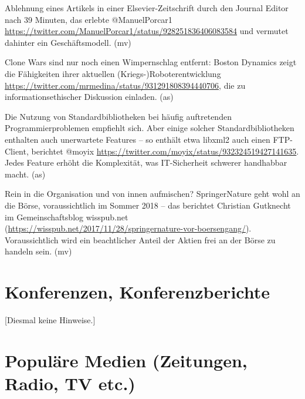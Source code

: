 \documentclass[a4paper,
fontsize=11pt,
oneside,
numbers=noperiodatend,
parskip=half-,
bibliography=totoc,
final
]{scrartcl}
\begin{document}
Ablehnung eines Artikels in einer Elsevier-Zeitschrift durch den Journal
Editor nach 39 Minuten, das erlebte @ManuelPorcar1
\url{https://twitter.com/ManuelPorcar1/status/928251836406083584} und
vermutet dahinter ein Geschäftsmodell. (mv)

Clone Wars sind nur noch einen Wimpernschlag entfernt: Boston Dynamics
zeigt die Fähigkeiten ihrer aktuellen (Kriegs-)Roboterentwicklung
\url{https://twitter.com/mrmedina/status/931291808394440706}, die zu
informationsethischer Diskussion einladen. (as)

Die Nutzung von Standardbibliotheken bei häufig auftretenden
Programmierproblemen empfiehlt sich. Aber einige solcher
Standardbibliotheken enthalten auch unerwartete Features -- so enthält
etwa libxml2 auch einen FTP-Client, berichtet @moyix
\url{https://twitter.com/moyix/status/932324519427141635}. Jedes Feature
erhöht die Komplexität, was IT-Sicherheit schwerer handhabbar macht.
(as)

Rein in die Organisation und von innen aufmischen? SpringerNature geht
wohl an die Börse, voraussichtlich im Sommer 2018 -- das berichtet
Christian Gutknecht im Gemeinschaftsblog wisspub.net
(\url{https://wisspub.net/2017/11/28/springernature-vor-boersengang/}).
Voraussichtlich wird ein beachtlicher Anteil der Aktien frei an der
Börse zu handeln sein. (mv)

\hypertarget{konferenzen-konferenzberichte}{%
\section*{Konferenzen,
Konferenzberichte}\label{konferenzen-konferenzberichte}}

{[}Diesmal keine Hinweise.{]}

\hypertarget{populuxe4re-medien-zeitungen-radio-tv-etc.}{%
\section*{Populäre Medien (Zeitungen, Radio, TV
etc.)}\label{populuxe4re-medien-zeitungen-radio-tv-etc.}}
\end{document}
